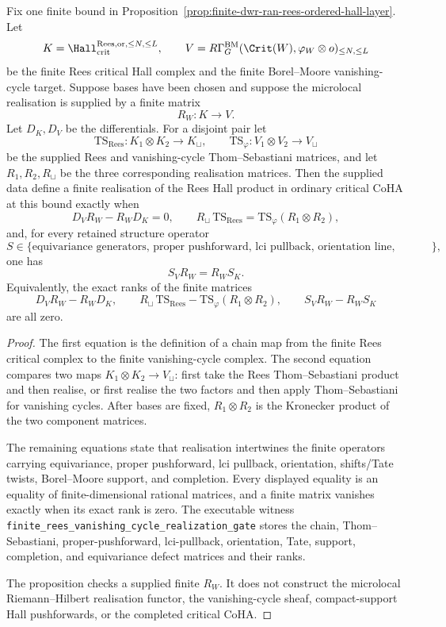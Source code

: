 \begin{proposition}
\label{prop:finite-rees-vanishing-cycle-realization-gate}
Fix one finite bound in
Proposition~\ref{prop:finite-dwr-ran-rees-ordered-hall-layer}. Let
\[
 K=\Hall_{\mathrm{crit}}^{\mathrm{Rees},\mathrm{or},\le N,\le L},
 \qquad
 V=R\Gamma^{\mathrm{BM}}_G(\Crit(W),\varphi_W\otimes o)_{\le N,\le L}
\]
be the finite Rees critical Hall complex and the finite
Borel--Moore vanishing-cycle target. Suppose bases have been chosen and
suppose the microlocal realisation is supplied by a finite matrix
\[
 R_W\colon K\longrightarrow V .
\]
Let \(D_K,D_V\) be the differentials. For a disjoint pair let
\[
 \mathrm{TS}_{\mathrm{Rees}}\colon K_1\otimes K_2\to K_\sqcup,\qquad
 \mathrm{TS}_{\varphi}\colon V_1\otimes V_2\to V_\sqcup
\]
be the supplied Rees and vanishing-cycle Thom--Sebastiani matrices, and
let \(R_1,R_2,R_\sqcup\) be the three corresponding realisation
matrices. Then the supplied data define a finite realisation of the
Rees Hall product in ordinary critical CoHA at this bound exactly when
\[
 D_VR_W-R_WD_K=0,
 \qquad
 R_\sqcup\,\mathrm{TS}_{\mathrm{Rees}}
 =
 \mathrm{TS}_{\varphi}(R_1\otimes R_2),
\]
and, for every retained structure operator
\[
 S\in\{\text{equivariance generators, proper pushforward,
 lci pullback, orientation line, shift/Tate operator,
 Borel--Moore support projection, completion projection}\},
\]
one has
\[
 S_VR_W=R_WS_K .
\]
Equivalently, the exact ranks of the finite matrices
\[
 D_VR_W-R_WD_K,\qquad
 R_\sqcup\,\mathrm{TS}_{\mathrm{Rees}}
 -
 \mathrm{TS}_{\varphi}(R_1\otimes R_2),
 \qquad
 S_VR_W-R_WS_K
\]
are all zero.
\end{proposition}

\begin{proof}
The first equation is the definition of a chain map from the finite
Rees critical complex to the finite vanishing-cycle complex. The second
equation compares two maps \(K_1\otimes K_2\to V_\sqcup\): first take
the Rees Thom--Sebastiani product and then realise, or first realise
the two factors and then apply Thom--Sebastiani for vanishing cycles.
After bases are fixed, \(R_1\otimes R_2\) is the Kronecker product of
the two component matrices.

The remaining equations state that realisation intertwines the finite
operators carrying equivariance, proper pushforward, lci pullback,
orientation, shifts/Tate twists, Borel--Moore support, and completion.
Every displayed equality is an equality of finite-dimensional rational
matrices, and a finite matrix vanishes exactly when its exact rank is
zero. The executable witness
\texttt{finite\_rees\_vanishing\_cycle\_realization\_gate} stores the
chain, Thom--Sebastiani, proper-pushforward, lci-pullback, orientation,
Tate, support, completion, and equivariance defect matrices and their
ranks.

The proposition checks a supplied finite \(R_W\). It does not construct
the microlocal Riemann--Hilbert realisation functor, the
vanishing-cycle sheaf, compact-support Hall pushforwards, or the
completed critical CoHA.
\end{proof}


